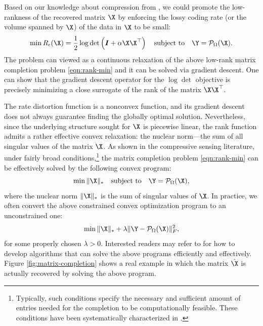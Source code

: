 \documentclass[../../book-main.tex]{subfiles}
\begin{document}
Based on our knowledge about compression from 
, we could  promote the low-rankness of the
recovered matrix $\X$ by enforcing the lossy coding rate (or the
volume spanned by $\X$) of the data in $\X$ to be small:
\begin{equation}
\min R_\epsilon(\X) = \frac{1}{2} \log \det \left(\boldsymbol{I} +
\alpha  \X\X^\top \right) \quad \mbox{subject to}
\quad
\Y = \mathcal{P}_{\Omega}(\X).
\label{eqn:rate-min}
\end{equation}
The problem can viewed as a continuous relaxation of the above
low-rank matrix completion problem \eqref{eqn:rank-min} and it can be
solved via gradient descent. One can show that the gradient descent
operator for the $\log\det$ objective is precisely minimizing a close
surrogate of the rank of the matrix $\X\X^\top$.

The rate distortion function is a nonconvex function, and its gradient
descent does not always guarantee finding the globally optimal solution. Nevertheless, since the underlying structure sought for $\X$ is piecewise linear, the rank function admits a rather effective convex relaxation: the
nuclear norm---the sum of all singular values of the matrix $\X$. As
shown in the compressive sensing literature, under fairly
broad conditions,\footnote{Typically, such conditions specify the
necessary and sufficient amount of entries needed for the completion
to be computationally feasible. These conditions have been
systematically characterized in \cite{Wright-Ma-2022}.} the matrix
completion problem \eqref{eqn:rank-min}
can be effectively solved by the following convex program:
\begin{equation}
\min \|\X\|_* \quad \mbox{subject to}
\quad
\Y = \mathcal{P}_{\Omega}(\X),
\label{eqn:nuclear-min}
\end{equation}
where the nuclear norm $\|\X\|_*$ is the sum of singular values of
$\X$. In practice, we often convert the above constrained convex optimization
program to an unconstrained one:
\begin{equation}
\min \|\X\|_*  + \lambda \|
\Y - \mathcal{P}_{\Omega}(\X)\|_F^2,
\label{eqn:nuclear-min-lagrangian}
\end{equation}
for some properly chosen $\lambda > 0$. Interested readers may refer to
\cite{Wright-Ma-2022} for how to develop algorithms  that can solve
the above programs  efficiently and effectively.
Figure \ref{fig:matrix-completion} shows a real example in which the
matrix $\hat \X$ is actually recovered by solving the above program.
\end{document}
